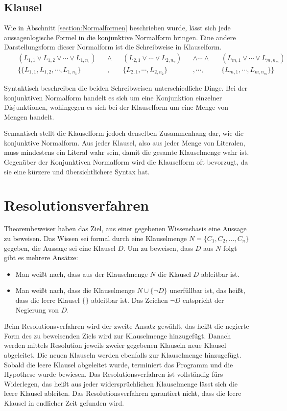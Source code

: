 		\subsection{Klausel}
Wie in Abschnitt \ref{section:Normalformen} beschrieben wurde, lässt sich jede aussagenlogische Formel in die konjunktive Normalform bringen. Eine andere Darstellungsform dieser Normalform ist die Schreibweise in Klauselform.
\begin{align*}
	&& (L_{1,1} \vee L_{1,2} \vee \cdots \vee L_{1,n_1}) &&\wedge &&
	(L_{2,1} \vee\cdots\vee L_{2,n_2}) && \wedge\cdots\wedge &&
	(L_{m,1} \vee\cdots\vee L_{m,n_m}) \\
	&& 
	\{\{L_{1,1},L_{1,2},\cdots,L_{1,n_1}\}&&,&&
	\{L_{2,1},\cdots,L_{2,n_2}\} &&,\cdots,&&
	\{L_{m,1},\cdots,L_{m,n_m}\}\}
\end{align*}

Syntaktisch beschreiben die beiden Schreibweisen unterschiedliche Dinge. Bei der konjunktiven Normalform handelt es sich um eine Konjunktion einzelner Disjunktionen, wohingegen es sich bei der Klauselform um eine Menge von Mengen handelt.

Semantisch stellt die Klauselform jedoch denselben Zusammenhang dar, wie die konjunktive Normalform. Aus jeder Klausel, also aus jeder Menge von Literalen, muss mindestens ein Literal wahr sein, damit die gesamte Klauselmenge wahr ist.
Gegenüber der Konjunktiven Normalform wird die Klauselform oft bevorzugt, da sie eine kürzere und übersichtlichere Syntax hat.

	\section{Resolutionsverfahren}

Theorembeweiser haben das Ziel, aus einer gegebenen Wissensbasis eine Aussage zu beweisen. Das Wissen sei formal durch eine Klauselmenge $N=\{C_1, C_2, ..., C_n \}$ gegeben, die Aussage sei eine Klausel $D$. Um zu beweisen, dass $D$ aus $N$ folgt gibt es mehrere Ansätze: 
\begin{itemize}
\item Man weißt nach, dass aus der Klauselmenge $N$ die Klausel $D$ ableitbar ist. 
\item Man weißt nach, dass die Klauselmenge $N\cup\{\neg D\}$  unerfüllbar ist, das heißt, dass die leere Klausel $\{\}$ ableitbar ist. Das Zeichen $\neg D$ entspricht der Negierung von $D$.
\end{itemize}

Beim Resolutionsverfahren wird der zweite Ansatz gewählt, das heißt die negierte Form des zu beweisenden Ziels wird zur Klauselmenge hinzugefügt. Danach werden mittels Resolution jeweils zweier gegebenen Klauseln neue Klausel abgeleitet. Die neuen Klauseln werden ebenfalls zur Klauselmenge hinzugefügt. Sobald die leere Klausel abgeleitet wurde, terminiert das Programm und die Hypothese wurde bewiesen. Das Resolutionsverfahren ist vollständig fürs Widerlegen, das heißt aus jeder widersprüchlichen Klauselmenge lässt sich die leere Klausel ableiten. Das Resolutionsverfahren garantiert nicht, dass die leere Klausel in endlicher Zeit gefunden wird. \cite{Chang1973Symb}

